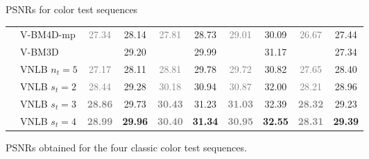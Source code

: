 \documentclass[mathserif, 8pt]{beamer}
\newcommand{\best}[1]{#1}
\newcommand{\bsic}[1]{\textcolor{gray}{#1}}
\newcommand{\Bsic}[1]{\textcolor{gray}{\textbf{#1}}}
\newcommand{\Best}[1]{\textbf{\textcolor{MyOrangeBrighter}{#1}}}
\begin{document}
\begin{frame}{PSNRs for color test sequences}
\begin{center}
{\begin{tabular}{ c | l |c c | c c | c c | c c}
			                      & V-BM4D-mp            & \bsic{27.34} &       28.14  & \bsic{27.81} &       28.73  & \bsic{29.01} &       30.09  & \bsic{26.67} &       27.44  \\
			                      & V-BM3D               & \bsic{     } &       29.20  & \bsic{     } & \best{29.99} & \bsic{     } &       31.17  & \bsic{     } &       27.34  \\
			                      & VNLB $n_t = 5$       & \bsic{27.17} &       28.11  & \bsic{28.81} &       29.78  & \bsic{29.72} &       30.82  & \bsic{27.65} & \best{28.40} \\
			                      & VNLB   $s_t = 2$     & \bsic{28.44} &       29.28  & \bsic{30.18} &       30.94  & \bsic{30.87} &       32.00  & \bsic{28.21} &       28.96  \\
			                      & VNLB   $s_t = 3$     & \Bsic{28.86} &       29.73  & \Bsic{30.43} &       31.23  & \Bsic{31.03} &       32.39  & \Bsic{28.32} &       29.23  \\
			                      & VNLB   $s_t = 4$     & \Bsic{28.99} & \Best{29.96} & \Bsic{30.40} & \Best{31.34} & \Bsic{30.95} & \Best{32.55} & \Bsic{28.31} & \Best{29.39} \\\hline
		\end{tabular}}

		\bigskip

		PSNRs obtained for the four classic color test sequences.
	\end{center}
\end{frame}
\end{document}
